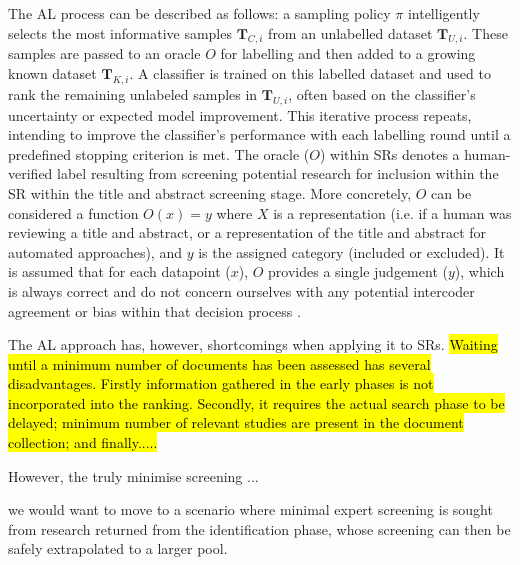 The AL process can be described as follows: a sampling policy $\pi$ intelligently selects the most informative samples  $\mathbf{T}_{C,i}$ from an unlabelled dataset $\mathbf{T}_{U,i}$.  These samples are passed to an oracle $O$ for labelling and then added to a growing known dataset $\mathbf{T}_{K,i}$. A classifier is trained on this labelled dataset and used to rank the remaining unlabeled samples in $\mathbf{T}_{U,i}$, often based on the classifier's uncertainty or expected model improvement. This iterative process repeats, intending to improve the classifier's performance with each labelling round until a predefined stopping criterion is met. The oracle ($O$) within SRs denotes a human-verified label resulting from screening potential research for inclusion within the SR within the title and abstract screening stage. More concretely, $O$ can be considered a function $O(x) = y$ where $X$ is a representation (i.e. if a human was reviewing a title and abstract, or a representation of the title and abstract for automated approaches), and $y$ is the assigned category (included or excluded). It is assumed that for each datapoint ($x$), $O$ provides a single judgement ($y$), which is always correct and do not concern ourselves with any potential intercoder agreement or bias within that decision process \cite{artstein_survey_2008}.









The AL approach has, however, shortcomings when applying it to SRs.
\hl{Waiting until a minimum number of documents has been assessed has several disadvantages. Firstly information gathered in the early phases is not incorporated into the ranking. Secondly, it requires the actual search phase to be delayed; minimum number of relevant studies are present in the document collection; and finally.....}



However, the truly minimise screening ...


we would want to move to a scenario where minimal expert screening is sought from research returned from the identification phase, whose screening can then be safely extrapolated to a larger pool.
